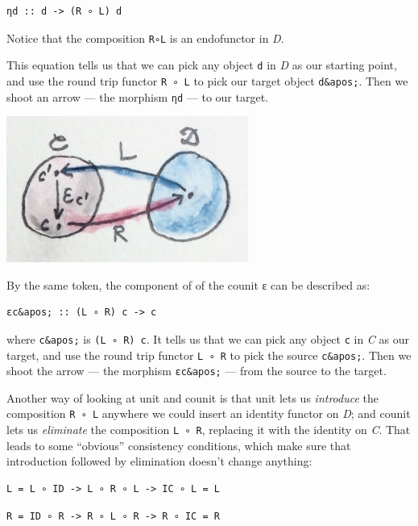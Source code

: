 \begin{verbatim}
ηd :: d -> (R ∘ L) d
\end{verbatim}

Notice that the composition \texttt{R∘L} is an endofunctor in \emph{D}.

This equation tells us that we can pick any object \texttt{d} in
\emph{D} as our starting point, and use the round trip functor
\texttt{R\ ∘\ L} to pick our target object \texttt{d\&apos;}. Then we
shoot an arrow --- the morphism \texttt{ηd} --- to our target.

\includegraphics[width=3.12500in]{images/adj-counit.jpg}

By the same token, the component of of the counit ε can be described as:

\begin{verbatim}
εc&apos; :: (L ∘ R) c -> c
\end{verbatim}

where \texttt{c\&apos;} is \texttt{(L\ ∘\ R)\ c}. It tells us that we
can pick any object \texttt{c} in \emph{C} as our target, and use the
round trip functor \texttt{L\ ∘\ R} to pick the source
\texttt{c\&apos;}. Then we shoot the arrow --- the morphism
\texttt{εc\&apos;} --- from the source to the target.

Another way of looking at unit and counit is that unit lets us
\emph{introduce} the composition \texttt{R\ ∘\ L} anywhere we could
insert an identity functor on \emph{D}; and counit lets us
\emph{eliminate} the composition \texttt{L\ ∘\ R}, replacing it with the
identity on \emph{C}. That leads to some ``obvious'' consistency
conditions, which make sure that introduction followed by elimination
doesn't change anything:

\begin{verbatim}
L = L ∘ ID -> L ∘ R ∘ L -> IC ∘ L = L
\end{verbatim}

\begin{verbatim}
R = ID ∘ R -> R ∘ L ∘ R -> R ∘ IC = R
\end{verbatim}


